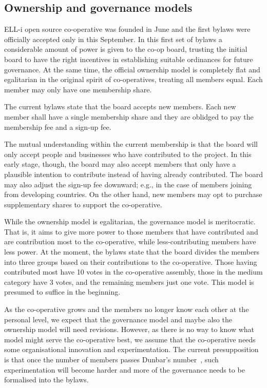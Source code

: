 \documentclass[draft,a4paper]{siamltex}
\begin{document}
\subsection{Ownership and governance models}
\label{ssec:ownership}

ELL-i open source co-operative was founded in June and the first
bylaws were officially accepted only in this September.  In this first
set of bylaws a considerable amount of power is given to the co-op
board, trusting the initial board to have the right incentives in
establishing suitable ordinances for future governance.  At the same
time, the official ownership model is completely flat and egalitarian
in the original spirit of co-operatives, treating all members equal.
Each member may only have one membership share.

The current bylaws state that the board accepts new members.  Each new
member shall have a single membership share and they are oblidged to
pay the membership fee and a sign-up fee.

The mutual understanding within the current membership is that the
board will only accept people and businesses who have contributed to
the project.  In this early stage, though, the board may also accept
members that only have a plausible intention to contribute instead of
having already contributed.  The board may also adjust the sign-up fee
downward; e.g., in the case of members joining from developing
countries.   On the other hand, new members may opt to purchase
supplementary shares to support the co-operative.

While the ownership model is egalitarian, the governance model is
meritocratic.  That is, it aims to give more power to those members
that have contributed and are contribution most to the co-operative,
while less-contributing members have less power.  At the moment, the
bylaws state that the board divides the members into three groups
based on their contributions to the co-operative.  Those having
contributed most have 10 votes in the co-operative assembly, those in
the medium category have 3 votes, and the remaining members just one
vote.  This model is presumed to suffice in the beginning.

As the co-operative grows and the members no longer know each other at
the personal level, we expect that the governance model and maybe also
the ownership model will need revisions.  However, as there is no way
to know what model might serve the co-operative best, we assume that
the co-operative needs some organisational innovation and
experimentation.  The current presupposition is that once the number
of members passes Dunbar's number~\cite{reference-needed}, such
experimentation will become harder and more of the governance needs to
be formalised into the bylaws.
\end{document}
